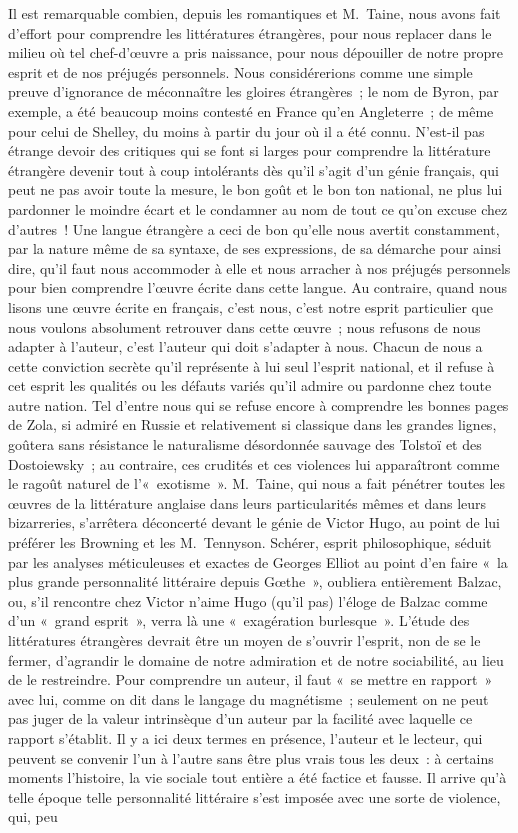 \documentclass[french,twoside]{book} %
\begin{document}
Il est remarquable combien, depuis les romantiques et M. Taine, nous avons fait d’effort pour comprendre les littératures étrangères, pour nous replacer dans le milieu où tel chef-d’œuvre a pris naissance, pour nous dépouiller de notre propre esprit et de nos préjugés personnels. Nous considérerions comme une simple preuve d’ignorance de méconnaître les gloires étrangères ; le nom de Byron, par exemple, a été beaucoup moins contesté en France qu’en Angleterre ; de même pour celui de Shelley, du moins à partir du jour où il a été connu. N’est-il pas étrange devoir des critiques qui se font si larges pour comprendre la littérature étrangère devenir tout à coup intolérants dès qu’il s’agit d’un génie français, qui peut ne pas avoir toute la mesure, le bon goût et le bon ton national, ne plus lui pardonner le moindre écart et le condamner au nom de tout ce qu’on excuse chez d’autres ! Une langue étrangère a ceci de bon qu’elle nous avertit constamment, par la nature même de sa syntaxe, de ses expressions, de sa démarche pour ainsi dire, qu’il faut nous accommoder à elle et nous arracher à nos préjugés personnels pour bien comprendre l’œuvre écrite dans cette langue. Au contraire, quand nous lisons une œuvre écrite en français, c’est nous, c’est notre esprit particulier que nous voulons absolument retrouver dans cette œuvre ; nous refusons de nous adapter à l’auteur, c’est l’auteur qui doit s’adapter à nous. Chacun de nous a cette conviction secrète qu’il représente à lui seul l’esprit national, et il refuse à cet esprit les qualités ou les défauts variés qu’il admire ou pardonne chez toute autre nation. Tel d’entre nous qui se refuse encore à comprendre les bonnes pages de Zola, si admiré en Russie et relativement si classique dans les grandes lignes, goûtera sans résistance le naturalisme désordonnée sauvage des Tolstoï et des Dostoiewsky ; au contraire, ces crudités et ces violences lui apparaîtront comme le ragoût naturel de l’« exotisme ». M. Taine, qui nous a fait pénétrer toutes les œuvres de la littérature anglaise dans leurs particularités mêmes et dans leurs bizarreries, s’arrêtera déconcerté devant le génie de Victor Hugo, au point de lui préférer les Browning et les M. Tennyson. Schérer, esprit philosophique, séduit par les analyses méticuleuses et exactes de Georges Elliot au point d’en faire « la plus grande personnalité littéraire depuis Gœthe », oubliera entièrement Balzac, ou, s’il rencontre chez Victor n’aime Hugo (qu’il pas) l’éloge de Balzac comme d’un « grand esprit », verra là une « exagération burlesque ». L’étude des littératures étrangères devrait être un moyen de s’ouvrir l’esprit, non de se le fermer, d’agrandir le domaine de notre admiration et de notre sociabilité, au lieu de le restreindre. Pour comprendre un auteur, il faut « se mettre en rapport » avec lui, comme on dit dans le langage du magnétisme ; seulement on ne peut pas juger de la valeur intrinsèque d’un auteur par la facilité avec laquelle ce rapport s’établit. Il y a ici deux termes en présence, l’auteur et le lecteur, qui peuvent se convenir l’un à l’autre sans être plus vrais tous les deux : à certains moments l’histoire, la vie sociale tout entière a été factice et fausse. Il arrive qu’à telle époque telle personnalité littéraire s’est imposée avec une sorte de violence, qui, peu 
\end{document}
